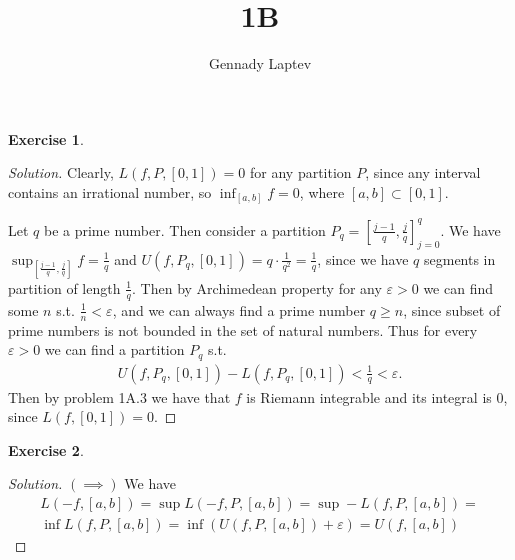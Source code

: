 \documentclass[letterpaper, 11pt, english]{article}
\title{1B}
\author{Gennady Laptev}
\date{}
\theoremstyle{definition}
\theoremstyle{definition}
\newtheorem{problem}{Exercise}
\theoremstyle{definition}
\newenvironment{sol}{\begin{proof}[Solution]}{\end{proof}}
\theoremstyle{plain} %
\theoremstyle{plain} %
\theoremstyle{plain} %
\theoremstyle{plain} %
\theoremstyle{remark}
\begin{document}
\maketitle
\setcounter{section}{0}

\setcounter{problem}{0}
\begin{problem}
\begin{sol}
    Clearly, $ L(f, P, [0,1]) = 0 $ for any partition $ P $,
    since any interval contains an irrational number, so
    $ \inf_{[a,b]} f = 0 $, where $ [a,b] \subset [0,1] $.

    Let $ q $ be a prime number. Then consider a partition
    $ P_q = [\frac{j-1}{q}, \frac{j}{q}]_{j = 0}^{q} $.
    We have $ \sup_{[\frac{j-1}{q}, \frac{j}{q}]} f = \frac{1}{q} $ 
    and $ U(f, P_q, [0,1]) = q \cdot \frac{1}{q^2} = \frac{1}{q}$,
    since we have $ q $ segments in partition of length $ \frac{1}{q} $.
    Then by Archimedean property for any $ \varepsilon > 0 $ we can find some
    $ n $ s.t. $ \frac{1}{n} < \varepsilon $, and we can always find a prime number $ q \geq n$, 
    since subset of prime numbers is not bounded in the set of natural numbers.
    Thus for every $ \varepsilon > 0 $ we can find a partition $ P_q $ s.t.
    \begin{gather*}
        U(f, P_q, [0,1]) - L(f, P_q, [0,1]) < \frac{1}{q}  < \varepsilon.
    \end{gather*}
    Then by problem 1A.3 we have that $ f $ is Riemann integrable and its integral is 0,
    since $ L(f,[0,1]) = 0 $.
\end{sol}
\end{problem}

\setcounter{problem}{1}
\begin{problem}
\begin{sol}
    $(\implies)$ We have
    \begin{gather*}
        L(-f, [a,b]) = \sup L(-f, P, [a,b]) = \sup -L(f, P, [a,b]) = \\ 
        \inf  L(f, P, [a,b]) = \inf (U(f, P, [a,b]) + \varepsilon) = 
        U(f, [a,b])
    \end{gather*}
    
\end{sol}
\end{problem}
\end{document}
